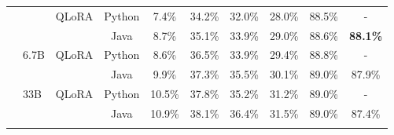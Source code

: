 \begin{table*}[t]
{\begin{tabular}{lllccccccc}
			& & \multirow{2}{*}{QLoRA} & \cellcolor[gray]{.70} Python & \cellcolor[gray]{.70} 7.4\% & \cellcolor[gray]{.70} 34.2\% & \cellcolor[gray]{.70} 32.0\% & \cellcolor[gray]{.70} 28.0\% & \cellcolor[gray]{.70} 88.5\% & \cellcolor[gray]{.70} - \\
			& & & \cellcolor[gray]{.9} Java & \cellcolor[gray]{.9} 8.7\% & \cellcolor[gray]{.9} 35.1\% & \cellcolor[gray]{.9} 33.9\% & \cellcolor[gray]{.9} 29.0\% & \cellcolor[gray]{.9} 88.6\% & \cellcolor[gray]{.9}  \cellcolor[HTML]{FFDEAD} \bf 88.1\%  \\
			\cline{2-10}
			
			& \multirow{2}{*}{6.7B} & \multirow{2}{*}{QLoRA} & \cellcolor[gray]{.70} Python & \cellcolor[gray]{.70} 8.6\% & \cellcolor[gray]{.70} 36.5\% &  \cellcolor[gray]{.70} \cellcolor[gray]{.70}\cellcolor[gray]{.70} 33.9\% & \cellcolor[gray]{.70} 29.4\% & \cellcolor[gray]{.70} 88.8\% & \cellcolor[gray]{.70} -  \\		
			& & & \cellcolor[gray]{.9} Java & \cellcolor[gray]{.9} 9.9\% & \cellcolor[gray]{.9} 37.3\% & \cellcolor[gray]{.9} 35.5\% & \cellcolor[gray]{.9} 30.1\% & \cellcolor[gray]{.9} 89.0\% &  \cellcolor[gray]{.9} 87.9\% \\
			\cline{2-10}
			
			
			& \multirow{2}{*}{33B} & \multirow{2}{*}{QLoRA} & \cellcolor[gray]{.70} Python & \cellcolor[gray]{.70} 10.5\% & \cellcolor[gray]{.70} 37.8\% & \cellcolor[gray]{.70} 35.2\% & \cellcolor[gray]{.70} 31.2\% & \cellcolor[gray]{.70}  89.0\% &  \cellcolor[gray]{.70} - \\
			& & & \cellcolor[gray]{.9} Java & \cellcolor[gray]{.9} 10.9\% & \cellcolor[gray]{.9} 38.1\% & \cellcolor[gray]{.9} 36.4\% & \cellcolor[gray]{.9} 31.5\% & \cellcolor[gray]{.9}  89.0\% & \cellcolor[gray]{.9} 87.4\%  \\
			
			\\
		

\end{tabular}}
\end{table*}
